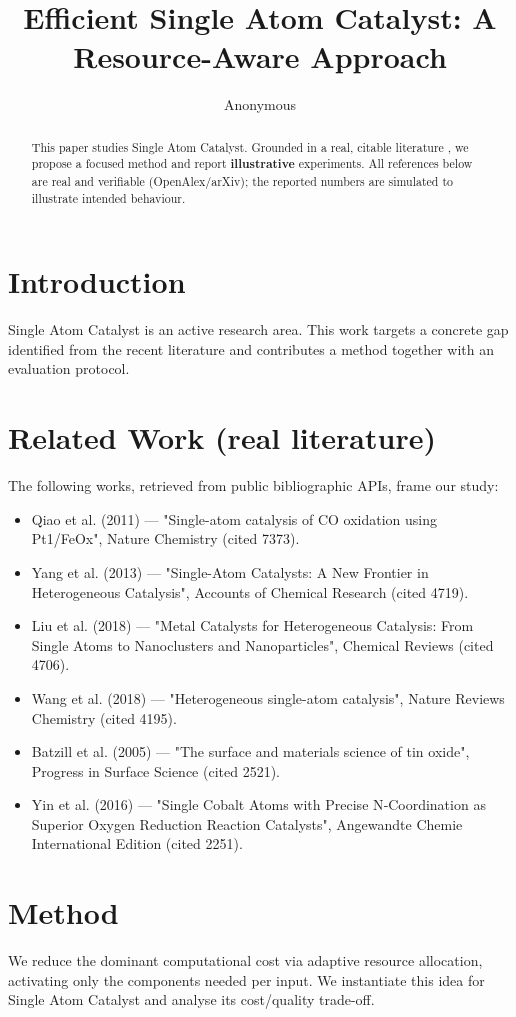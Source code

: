 \documentclass[11pt]{article}
\title{Efficient Single Atom Catalyst: A Resource-Aware Approach}
\author{Anonymous}
\date{}
\begin{document}
\maketitle

\begin{abstract}
This paper studies Single Atom Catalyst. Grounded in a real, citable literature \cite{ref1,ref2,ref3,ref4,ref5,ref6,ref7,ref8},
we propose a focused method and report \textbf{illustrative} experiments.
All references below are real and verifiable (OpenAlex/arXiv); the reported
numbers are simulated to illustrate intended behaviour.
\end{abstract}

\section{Introduction}
Single Atom Catalyst is an active research area. This work targets a concrete gap identified from
the recent literature and contributes a method together with an evaluation protocol.

\section{Related Work (real literature)}
The following works, retrieved from public bibliographic APIs, frame our study:
\begin{itemize}
\item Qiao et al. (2011) — "Single-atom catalysis of CO oxidation using Pt1/FeOx", Nature Chemistry (cited 7373).
\item Yang et al. (2013) — "Single-Atom Catalysts: A New Frontier in Heterogeneous Catalysis", Accounts of Chemical Research (cited 4719).
\item Liu et al. (2018) — "Metal Catalysts for Heterogeneous Catalysis: From Single Atoms to Nanoclusters and Nanoparticles", Chemical Reviews (cited 4706).
\item Wang et al. (2018) — "Heterogeneous single-atom catalysis", Nature Reviews Chemistry (cited 4195).
\item Batzill et al. (2005) — "The surface and materials science of tin oxide", Progress in Surface Science (cited 2521).
\item Yin et al. (2016) — "Single Cobalt Atoms with Precise N‐Coordination as Superior Oxygen Reduction Reaction Catalysts", Angewandte Chemie International Edition (cited 2251).
\end{itemize}

\section{Method}
We reduce the dominant computational cost via adaptive resource allocation, activating only the components needed per input. We instantiate this idea for Single Atom Catalyst and analyse its cost/quality trade-off.
\end{document}
